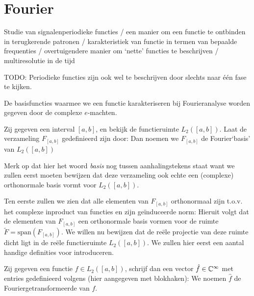 \chapter{Fourier}

Studie van signalenperiodieke functies /
een manier om een functie te ontbinden in terugkerende patronen /
karakteristiek van functie in termen van bepaalde frequenties /
overtuigendere manier om `nette' functies te beschrijven /
multiresolutie in de tijd

TODO: Periodieke functies zijn ook wel te beschrijven door slechts naar \'e\'en fase te kijken.

De basisfuncties waarmee we een functie karakteriseren bij Fourieranalyse worden gegeven door de complexe
$e$-machten.
\begin{definitie}[FourierBasis] Zij gegeven een interval $[a,b]$, en bekijk de functieruimte $L_2([a,b])$. Laat de verzameling $F_{[a,b]}$ gedefinieerd zijn door:
  Dan noemen we $F_{[a,b]}$ de Fourier`basis' van $L_2([a,b])$
\end{definitie}
Merk op dat hier het woord \emph{basis} nog tussen aanhalingstekens staat want we zullen eerst moeten bewijzen dat deze
verzameling ook echte een (complexe) orthonormale basis vormt voor $L_2([a,b])$.

Ten eerste zullen we zien dat alle elementen van $F_{[a,b]}$ orthonormaal zijn t.o.v. het complexe inproduct van functies en zijn ge\"induceerde norm:
Hieruit volgt dat de elementen van $F_{[a,b]}$ een orthonormale basis vormen voor de ruimte $\tilde F = \text{span}(F_{[a,b]})$.
We willen nu bewijzen dat de re\"ele projectie van deze ruimte dicht ligt in de re\"ele functieruimte $L_2([a,b])$.
We zullen hier eerst een aantal handige definities voor introduceren.

\begin{definitie}[Fouriergetransformeerde]
  Zij gegeven een functie $f\in L_2({[a,b]})$, schrijf dan een vector $\hat f \in \mathbb{C}^\infty$ met entries gedefinieerd volgens (hier aangegeven met blokhaken):
  We noemen $\hat f$ de Fouriergetransformeerde van $f$.
\end{definitie}

